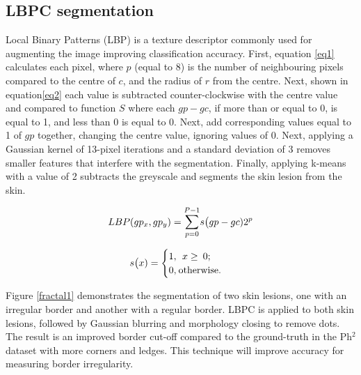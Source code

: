\subsection{LBPC segmentation}

Local Binary Patterns (LBP) is a texture descriptor commonly used for augmenting the image improving classification accuracy\cite{Pereira2020, Kaya2016}. First, equation \ref{eq1} calculates each pixel, where $p$ (equal to 8) is the number of neighbouring pixels compared to the centre of $c$, and the radius of $r$ from the centre. Next, shown in equation\ref{eq2} each value is subtracted counter-clockwise with the centre value and compared to function $S$ where each $gp - gc$, if more than or equal to 0, is equal to 1, and less than 0 is equal to 0. Next, add corresponding values equal to 1 of $gp$ together, changing the centre value, ignoring values of 0. Next, applying a Gaussian kernel of 13-pixel iterations and a standard deviation of 3 removes smaller features that interfere with the segmentation. Finally, applying k-means with a value of 2 subtracts the greyscale and segments the skin lesion from the skin.

\begin{equation} \label{eq1}
LBP(gp_x, gp_y) = \mathlarger{\sum}_{p=0}^{P-1}s\big(gp - gc)2^p
\end{equation}

\begin{equation} \label{eq2}
s\big(x) = 
\begin{cases}
1,\:\:x\geq\:0; \\
0,\:$otherwise$.
\end{cases}
\end{equation}

Figure \ref{fractal1} demonstrates the segmentation of two skin lesions, one with an irregular border and another with a regular border. LBPC is applied to both skin lesions, followed by Gaussian blurring and morphology closing to remove dots. The result is an improved border cut-off compared to the ground-truth in the Ph$^2$ dataset with more corners and ledges. This technique will improve accuracy for measuring border irregularity\cite{Pereira2020}.

